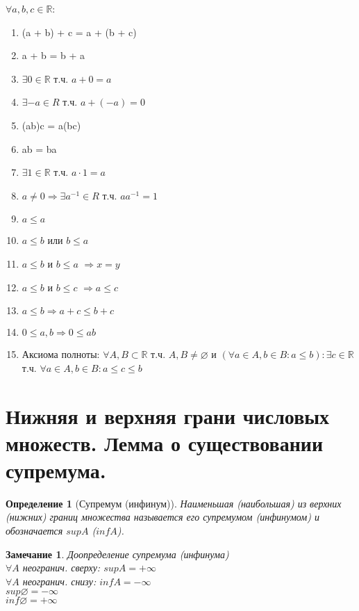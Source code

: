 \documentclass[11pt,a4paper,titlepage]{article}
\newtheorem*{definition}{Определение}
\newtheorem*{remark}{Замечание}
\renewcommand{\implies}{\Rightarrow}
\renewcommand{\emptyset}{\varnothing}
\newcommand{\R}{\mathbb{R}}
\begin{document}
    $\forall a, b, c \in \R$:
    \begin{enumerate}
        \item (a + b) + c = a + (b + c)
        \item a + b = b + a
        \item $\exists 0 \in \R$ т.ч. $a + 0 = a$
        \item $\exists -a \in R$ т.ч. $a + (-a) = 0$
        \item (ab)c = a(bc)
        \item ab = ba
        \item $\exists 1 \in \R$ т.ч. $a \cdot 1 = a$
        \item $ a \neq 0 \implies \exists a^{-1} \in R$ т.ч. $aa^{-1} = 1$
        \item $a \leq a$
        \item $a \leq b$ или $b \leq a$
        \item $a \leq b$ и $b \leq a$ $\implies x = y$
        \item $a \leq b$ и $b \leq c$ $\implies a \leq c$
        \item $a \leq b \implies a+c \leq b+c$
        \item $0 \leq a,b \implies 0 \leq ab$
        \item Аксиома полноты: $\forall A, B \subset \R$ т.ч. $A, B \neq \emptyset$ и $(\forall a \in A, b \in B: a \leq b): \exists c \in \R$ т.ч. $\forall a \in A, b \in B: a \leq c \leq b$
    \end{enumerate}


    \section{Нижняя и верхняя грани числовых множеств. Лемма о существовании супремума.}

    \begin{definition}[Супремум (инфинум)]
        Наименьшая (наибольшая) из верхних (нижних) границ множества называется его супремумом (инфинумом) и обозначается $supA$ ($infA$).
    \end{definition}

    \begin{remark}
        Доопределение супремума (инфинума) \\
        $\forall A$ неогранич. сверху: $supA = +\infty$\\
        $\forall A$ неогранич. снизу: $infA = -\infty$\\
        $sup\emptyset = -\infty$\\
        $inf\emptyset = +\infty$
    \end{remark}
\end{document}
